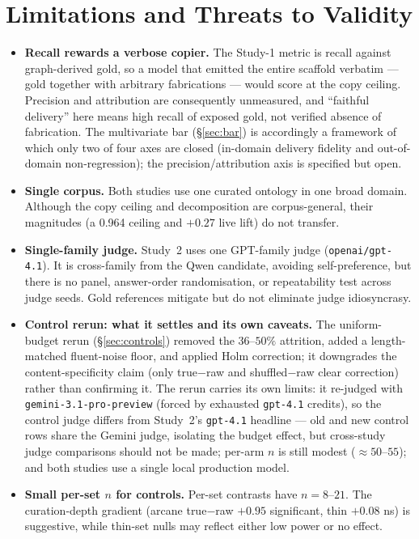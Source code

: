 \documentclass[10pt,twocolumn]{article}
\begin{document}
\section{Limitations and Threats to Validity}\label{sec:limits}
\begin{itemize}[topsep=2pt,itemsep=2pt,leftmargin=1.4em]
\item \textbf{Recall rewards a verbose copier.} The Study-1 metric is recall against graph-derived gold, so a model that emitted the entire scaffold verbatim --- gold together with arbitrary fabrications --- would score at the copy ceiling. Precision and attribution are consequently unmeasured, and ``faithful delivery'' here means high recall of exposed gold, not verified absence of fabrication. The multivariate bar (\S\ref{sec:bar}) is accordingly a framework of which only two of four axes are closed (in-domain delivery fidelity and out-of-domain non-regression); the precision/attribution axis is specified but open.
\item \textbf{Single corpus.} Both studies use one curated ontology in one broad domain. Although the copy ceiling and decomposition are corpus-general, their magnitudes (a 0.964 ceiling and $+0.27$ live lift) do not transfer.
\item \textbf{Single-family judge.} Study~2 uses one GPT-family judge
(\texttt{openai/gpt-4.1}). It is cross-family from the Qwen candidate, avoiding self-preference, but there is no panel, answer-order randomisation, or repeatability test across judge seeds. Gold references mitigate but do not eliminate judge idiosyncrasy.
\item \textbf{Control rerun: what it settles and its own caveats.} The uniform-budget rerun (\S\ref{sec:controls}) removed the $36$--$50\%$ attrition, added a length-matched fluent-noise floor, and applied Holm correction; it downgrades the content-specificity claim (only true$-$raw and shuffled$-$raw clear correction) rather than confirming it. The rerun carries its own limits: it re-judged with \texttt{gemini-3.1-pro-preview} (forced by exhausted \texttt{gpt-4.1} credits), so the control judge differs from Study~2's \texttt{gpt-4.1} headline --- old and new control rows share the Gemini judge, isolating the budget effect, but cross-study judge comparisons should not be made; per-arm $n$ is still modest ($\approx50$--$55$); and both studies use a single local production model.
\item \textbf{Small per-set $n$ for controls.} Per-set contrasts have $n=8$--$21$. The curation-depth gradient (arcane true$-$raw $+0.95$ significant, thin $+0.08$ ns) is suggestive, while thin-set nulls may reflect either low power or no effect.

\end{itemize}
\end{document}
